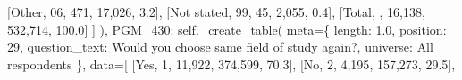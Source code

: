 \documentclass[
  11pt,
  a4paper,
]{article}
\newenvironment{Shaded}{\begin{snugshade}}{\end{snugshade}}
\newcommand{\NormalTok}[1]{\textcolor[rgb]{0.00,0.23,0.31}{#1}}
\newcommand{\OperatorTok}[1]{\textcolor[rgb]{0.37,0.37,0.37}{#1}}
\newcommand{\StringTok}[1]{\textcolor[rgb]{0.13,0.47,0.30}{#1}}
\newcommand{\VariableTok}[1]{\textcolor[rgb]{0.07,0.07,0.07}{#1}}
\begin{document}
\begin{Shaded}
\begin{Highlighting}[]
\NormalTok{                    [}\StringTok{\textquotesingle{}Other\textquotesingle{}}\NormalTok{, }\StringTok{\textquotesingle{}06\textquotesingle{}}\NormalTok{, }\StringTok{\textquotesingle{}471\textquotesingle{}}\NormalTok{, }\StringTok{\textquotesingle{}17,026\textquotesingle{}}\NormalTok{, }\StringTok{\textquotesingle{}3.2\textquotesingle{}}\NormalTok{],}
\NormalTok{                    [}\StringTok{\textquotesingle{}Not stated\textquotesingle{}}\NormalTok{, }\StringTok{\textquotesingle{}99\textquotesingle{}}\NormalTok{, }\StringTok{\textquotesingle{}45\textquotesingle{}}\NormalTok{, }\StringTok{\textquotesingle{}2,055\textquotesingle{}}\NormalTok{, }\StringTok{\textquotesingle{}0.4\textquotesingle{}}\NormalTok{],}
\NormalTok{                    [}\StringTok{\textquotesingle{}Total\textquotesingle{}}\NormalTok{, }\StringTok{\textquotesingle{}\textquotesingle{}}\NormalTok{, }\StringTok{\textquotesingle{}16,138\textquotesingle{}}\NormalTok{, }\StringTok{\textquotesingle{}532,714\textquotesingle{}}\NormalTok{, }\StringTok{\textquotesingle{}100.0\textquotesingle{}}\NormalTok{]}
\NormalTok{                ]}
\NormalTok{            ),}
            \StringTok{\textquotesingle{}PGM\_430\textquotesingle{}}\NormalTok{: }\VariableTok{self}\NormalTok{.\_create\_table(}
\NormalTok{                meta}\OperatorTok{=}\NormalTok{\{}
                    \StringTok{\textquotesingle{}length\textquotesingle{}}\NormalTok{: }\StringTok{\textquotesingle{}1.0\textquotesingle{}}\NormalTok{, }\StringTok{\textquotesingle{}position\textquotesingle{}}\NormalTok{: }\StringTok{\textquotesingle{}29\textquotesingle{}}\NormalTok{,}
                    \StringTok{\textquotesingle{}question\_text\textquotesingle{}}\NormalTok{: }\StringTok{\textquotesingle{}Would you choose same field of study again?\textquotesingle{}}\NormalTok{,}
                    \StringTok{\textquotesingle{}universe\textquotesingle{}}\NormalTok{: }\StringTok{\textquotesingle{}All respondents\textquotesingle{}}
\NormalTok{                \},}
\NormalTok{                data}\OperatorTok{=}\NormalTok{[}
\NormalTok{                    [}\StringTok{\textquotesingle{}Yes\textquotesingle{}}\NormalTok{, }\StringTok{\textquotesingle{}1\textquotesingle{}}\NormalTok{, }\StringTok{\textquotesingle{}11,922\textquotesingle{}}\NormalTok{, }\StringTok{\textquotesingle{}374,599\textquotesingle{}}\NormalTok{, }\StringTok{\textquotesingle{}70.3\textquotesingle{}}\NormalTok{],}
\NormalTok{                    [}\StringTok{\textquotesingle{}No\textquotesingle{}}\NormalTok{, }\StringTok{\textquotesingle{}2\textquotesingle{}}\NormalTok{, }\StringTok{\textquotesingle{}4,195\textquotesingle{}}\NormalTok{, }\StringTok{\textquotesingle{}157,273\textquotesingle{}}\NormalTok{, }\StringTok{\textquotesingle{}29.5\textquotesingle{}}\NormalTok{],}

\end{Highlighting}
\end{Shaded}
\end{document}
